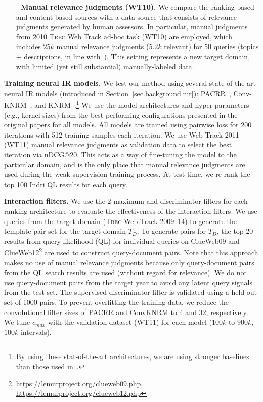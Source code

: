 \begin{itemize}[leftmargin=*]
\item[-] \textbf{Manual relevance judgments (WT10).}
We compare the ranking-based and content-based sources with a data source that consists of relevance judgments generated by human assessors. In particular, manual judgments from 2010 \textsc{Trec} Web Track ad-hoc task (WT10) are employed, which includes $25k$ manual relevance judgments ($5.2k$ relevant) for 50 queries (topics + descriptions, in line with~\cite{hui2017pacrr,guo2016deep}). This setting represents a new target domain, with limited (yet still substantial) manually-labeled data.

\end{itemize}


\textbf{Training neural IR models.}
We test our method using several state-of-the-art neural IR models (introduced in Section~\ref{sec.background.nir}):
PACRR~\cite{hui2017pacrr},
Conv-KNRM~\cite{convknrm}, and
KNRM~\cite{xiong2017end}.\footnote{By using these stat-of-the-art architectures, we are using stronger baselines than those used in~\cite{dehghani2017neural,Li2018JointLF}.}
We use the model architectures and hyper-parameters (e.g., kernel sizes) from the best-performing configurations presented in the original papers for all models.
All models are trained using pairwise loss for 200 iterations with 512 training samples each iteration.
We use Web Track 2011 (WT11) manual relevance judgments as validation data to select the best iteration via nDCG@20. This acts as a way of fine-tuning the model to the particular domain, and is the only place that manual relevance judgments are used during the weak supervision training process. At test time, we re-rank the top 100 Indri QL results for each query.

\textbf{Interaction filters.}
We use the 2-maximum and discriminator filters for each ranking architecture to evaluate the effectiveness of the interaction filters.
We use queries from the target domain (\textsc{Trec} Web Track 2009--14) to generate the template pair set for the target domain $T_D$.
To generate pairs for $T_D$, the top 20 results from query likelihood (QL) for individual queries on ClueWeb09 and ClueWeb12\footnote{\url{https://lemurproject.org/clueweb09.php}, \url{https://lemurproject.org/clueweb12.php}} are used to construct query-document pairs.
Note that this approach makes no use of manual relevance judgments because only query-document pairs from the QL search results are used (without regard for relevance).
We do not use query-document pairs from the target year to avoid any latent query signals from the test set. The supervised discriminator filter is validated using a held-out set of 1000 pairs. To prevent overfitting the training data, we reduce the convolutional filter sizes of PACRR and ConvKNRM to 4 and 32, respectively. We tune $c_{max}$ with the validation dataset (WT11) for each model ($100k$ to $900k$, $100k$ intervals).

